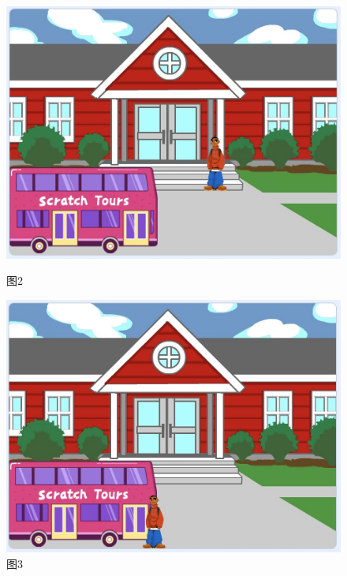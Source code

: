\documentclass[10pt, a4paper]{article}
\begin{document}
\begin{enumerate}
\begin{figure}[htbp]
\begin{minipage}{.24\textwidth}
                \includegraphics[width=\textwidth]{36-2.jpg}
                \caption*{图2}
            \end{minipage}
            \begin{minipage}{.24\textwidth}
                \centering
                \includegraphics[width=\textwidth]{36-3.jpg}
                \caption*{图3}
            \end{minipage}
            \begin{minipage}{.24\textwidth}
                \centering

\end{minipage}
\end{figure}
\end{enumerate}
\end{document}
